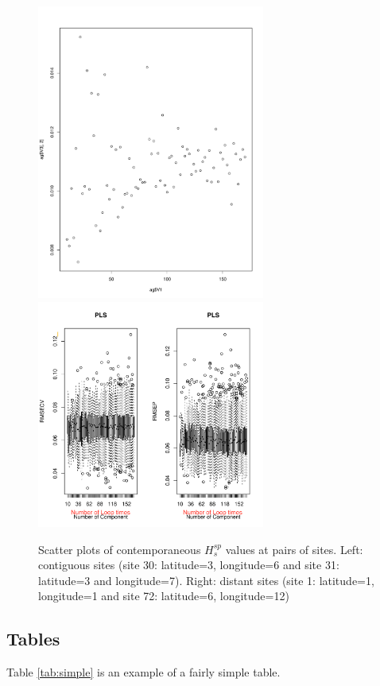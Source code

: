 \documentclass[a4paper,12pt,titlepage]{article} %
\numberwithin{equation}{section}  %
\begin{document}
\begin{figure}[h]    %
\centering           %
\includegraphics[width=7.5cm, angle=0]{Number of loop times mp5~1.pdf}  %
\includegraphics[width=7.5cm, angle=0]{Rplots.pdf} %
\vspace*{-0.25cm}    %
\caption{Scatter plots of contemporaneous $H^{sp}_s$ values at pairs of sites.  Left: contiguous sites (site 30: latitude=3, longitude=6 and site 31: latitude=3 and longitude=7). Right: distant sites (site 1: latitude=1, longitude=1 and site 72: latitude=6, longitude=12)}          %
\label{fig:space_dep}               %
\end{figure}                        %

\subsection{Tables}
\label{sec:tables}
Table \ref{tab:simple} is an example of a fairly simple table.
\end{document}
